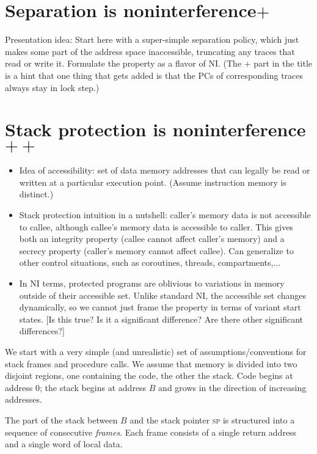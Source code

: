 \documentclass[conference]{IEEEtran}
\begin{document}
\section{Separation is noninterference$+$}

Presentation idea: Start here with a super-simple separation policy, which
just makes some part of the address space inaccessible, truncating any
traces that read or write it.  Formulate the property as a flavor of NI.
(The $+$ part in the title is a hint that one thing that gets added is that
the PCs of corresponding traces always stay in lock step.)

\section{Stack protection is noninterference$++$}

\begin{itemize}
\item
  Idea of accessibility: set of data memory addresses that can legally be read or written at a particular execution point.
  (Assume instruction memory is distinct.)
\item
  Stack protection intuition in a nutshell: caller's memory data is not accessible to callee, although callee's memory data is accessible to caller.
  This gives both an integrity property (callee cannot affect caller's memory) and a secrecy property
  (caller's memory cannot affect callee).
  Can generalize to other control situations, such as coroutines, threads, compartments,...
\item
  In NI terms, protected programs are oblivious to variations in memory outside of their accessible set.
  Unlike standard NI, the accessible set changes dynamically, so we cannot just frame the property in terms of
  variant start states. [Is this true? Is it a significant difference? Are there other significant differences?]
\end{itemize}

We start with a very simple (and unrealistic) set of assumptions/conventions for stack frames and procedure calls.
We assume that memory is divided into two disjoint regions, one containing the code, the other the stack.
Code begins at address 0; the stack begins at address $B$ and grows in the direction of increasing addresses.

The part of the stack between $B$ and the stack pointer \textsc{sp} is structured into a sequence of consecutive
\emph{frames}. Each frame consists of a single return address and a single word of local data.
\end{document}

